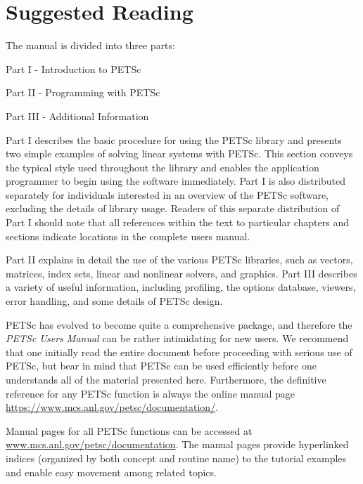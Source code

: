 \section{Suggested Reading}

The manual is
divided into three parts:
\begin{tightitemize}
\item Part I - Introduction to PETSc
\item Part II - Programming with PETSc
\item Part III - Additional Information
\end{tightitemize}

Part I describes
the basic procedure for using the PETSc library and presents two
simple examples of solving linear systems with PETSc.  This section
conveys the typical style used throughout the library and enables the
application programmer to begin using the software immediately.
Part I is also distributed separately for individuals interested in an
overview of the PETSc software, excluding the details of library usage.
Readers of this separate distribution of Part I should note that all
references within the text to particular chapters and sections
indicate locations in the complete users manual.

Part II explains in detail the use of the various PETSc libraries,
such as vectors, matrices, index sets, linear and nonlinear
solvers, and graphics.  Part III describes a variety of useful
information, including profiling, the options database, viewers, error
handling, and some details of
PETSc design.

\nocite{efficient}

PETSc has evolved to become quite a comprehensive package, and therefore the
{\em PETSc Users Manual} can be rather intimidating for new users. We
recommend that one initially read the entire document before proceeding with
serious use of PETSc, but bear in mind that PETSc can be used efficiently
before one understands all of the material presented here. Furthermore, the
definitive reference for any PETSc function is always the online manual page
\href{https://www.mcs.anl.gov/petsc/documentation/}{https://www.mcs.anl.gov/petsc/documentation/}.

\medskip \medskip

Manual pages for all PETSc functions can be
accessed at \href{https://www.mcs.anl.gov/petsc/documentation/}{www.mcs.anl.gov/petsc/documentation}.
The manual pages
provide hyperlinked indices (organized by
both concept and routine name) to the tutorial examples and enable
easy movement among related topics.

